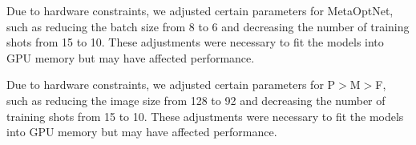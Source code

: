\begin{table}[htbp]
\centering
\caption{Hyperparameters used to train Prototypical Networks for 5-shot and 1-shot experiments.}
\label{sup:1}
\end{table}


Due to hardware constraints, we adjusted certain parameters for MetaOptNet, such as reducing the batch size from 8 to 6 and decreasing the number of training shots from 15 to 10. These adjustments were necessary to fit the models into GPU memory but may have affected performance.

{\color{black} Due to hardware constraints, we adjusted certain parameters for P$>$M$>$F, such as reducing the image size from 128 to 92 and decreasing the number of training shots from 15 to 10. These adjustments were necessary to fit the models into GPU memory but may have affected performance.}

